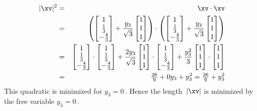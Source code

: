 \begin{example}
\begin{solution} 
\begin{eqnarray*}
|\xv|^2&=&\xv\cdot\xv
\\&=&\left(\begin{bmatrix} 1\\\frac13\\-\frac43 \end{bmatrix}
+\frac{y_3}{\sqrt3}\begin{bmatrix} 1\\1\\1 \end{bmatrix}\right)
\cdot\left(\begin{bmatrix} 1\\\frac13\\-\frac43 \end{bmatrix}
+\frac{y_3}{\sqrt3}\begin{bmatrix} 1\\1\\1 \end{bmatrix}\right)
\\&=&\begin{bmatrix} 1\\\frac13\\-\frac43 \end{bmatrix}\cdot\begin{bmatrix} 1\\\frac13\\-\frac43 \end{bmatrix}
+\frac{2y_3}{\sqrt3}\begin{bmatrix} 1\\1\\1 \end{bmatrix}\cdot\begin{bmatrix} 1\\\frac13\\-\frac43 \end{bmatrix}
+\frac{y_3^2}{3}\begin{bmatrix} 1\\1\\1 \end{bmatrix}
\cdot\begin{bmatrix} 1\\1\\1 \end{bmatrix}
\\&=&\tfrac{26}9+0y_3+y_3^2
=\tfrac{26}9+y_3^2
\end{eqnarray*}
This quadratic is minimized for \(y_3=0\)\,.
Hence the length~\(|\xv|\) is minimized by the free variable \(y_3=0\)\,.
\end{solution}
\end{example}



